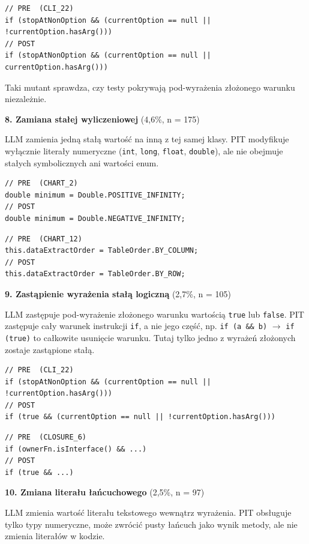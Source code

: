 \documentclass[12pt,a4paper,oldfontcommands]{memoir}
\theoremstyle{plain}
\theoremstyle{definition}
\theoremstyle{remark}
\begin{document}
    \begin{lstlisting}
// PRE  (CLI_22)
if (stopAtNonOption && (currentOption == null || !currentOption.hasArg()))
// POST
if (stopAtNonOption && (currentOption == null || currentOption.hasArg()))
    \end{lstlisting}

    Taki mutant sprawdza, czy testy pokrywają pod-wyrażenia złożonego warunku niezależnie.

    \textbf{8. Zamiana stałej wyliczeniowej} (4,6\%, n = 175)

    LLM zamienia jedną stałą wartość na inną z tej samej klasy.
    PIT modyfikuje wyłącznie literały numeryczne (\texttt{int}, \texttt{long}, \texttt{float}, \texttt{double}), ale nie obejmuje stałych symbolicznych ani wartości enum.

    \begin{lstlisting}
// PRE  (CHART_2)
double minimum = Double.POSITIVE_INFINITY;
// POST
double minimum = Double.NEGATIVE_INFINITY;
    \end{lstlisting}

    \begin{lstlisting}
// PRE  (CHART_12)
this.dataExtractOrder = TableOrder.BY_COLUMN;
// POST
this.dataExtractOrder = TableOrder.BY_ROW;
    \end{lstlisting}

    \textbf{9. Zastąpienie wyrażenia stałą logiczną} (2,7\%, n = 105)

    LLM zastępuje pod-wyrażenie złożonego warunku wartością \texttt{true} lub \texttt{false}.
    PIT zastępuje cały warunek instrukcji \texttt{if}, a nie jego część, np. \texttt{if (a \&\& b)} $\rightarrow$ \texttt{if (true)} to całkowite usunięcie warunku.
    Tutaj tylko jedno z wyrażeń złożonych zostaje zastąpione stałą.

    \begin{lstlisting}
// PRE  (CLI_22)
if (stopAtNonOption && (currentOption == null || !currentOption.hasArg()))
// POST
if (true && (currentOption == null || !currentOption.hasArg()))
    \end{lstlisting}

    \begin{lstlisting}
// PRE  (CLOSURE_6)
if (ownerFn.isInterface() && ...)
// POST
if (true && ...)
    \end{lstlisting}

    \textbf{10. Zmiana literału łańcuchowego} (2,5\%, n = 97)

    LLM zmienia wartość literału tekstowego wewnątrz wyrażenia.
    PIT obsługuje tylko typy numeryczne, może zwrócić pusty łańcuch jako wynik metody, ale nie zmienia literałów w kodzie.
\end{document}
